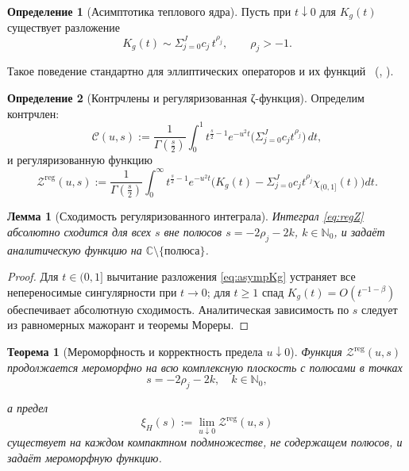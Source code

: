 \documentclass{article}
\numberwithin{equation}{section}
\theoremstyle{plain}
\newtheorem{theorem}{Теорема}
\newtheorem{lemma}{Лемма}
\theoremstyle{definition}
\newtheorem{definition}{Определение}
\theoremstyle{remark}
\def\rho{ρ}\def\sigma{σ}\def\Sigma{Σ}\def\tau{τ}%
\def\infty{∞}\def\partial{∂}\def\sum{Σ}\def\int{∫}%
\begin{document}
\begin{definition}[Асимптотика теплового ядра]
\label{def:asymp}
Пусть при \(t\downarrow 0\) для \(K_g(t)\) существует разложение
\begin{equation}
\label{eq:asympKg}
K_g(t)\sim \sum_{j=0}^{J} c_j\,t^{\rho_j}, \qquad \rho_j>-1.
\end{equation}
\end{definition}

\noindent
Такое поведение стандартно для эллиптических операторов и их функций 
~(\cite{Seeley1967}, \cite{Gilkey1995}).

\begin{definition}[Контрчлены и регуляризованная ζ-функция]
\label{def:counter}
Определим контрчлен:
\begin{equation}
\label{eq:counterterm}
\mathcal C(u,s)
:=\frac{1}{\Gamma(\tfrac s2)}\int_0^1 
t^{\frac s2-1} e^{-u^2 t}
\Big(\sum_{j=0}^{J} c_j t^{\rho_j}\Big)\,dt,
\end{equation}
и регуляризованную функцию
\begin{equation}
\label{eq:regZ}
\mathcal Z^{\mathrm{reg}}(u,s)
:=\frac{1}{\Gamma(\tfrac s2)}
\int_0^\infty t^{\frac s2-1} e^{-u^2 t}
\bigg(K_g(t)-\sum_{j=0}^{J} c_j t^{\rho_j}\chi_{(0,1]}(t)\bigg)dt.
\end{equation}
\end{definition}

\begin{lemma}[Сходимость регуляризованного интеграла]
\label{lemma:conv_reg}
Интеграл \eqref{eq:regZ} абсолютно сходится для всех \(s\) вне полюсов \(s=-2\rho_j-2k\), \(k\in\mathbb N_0\),
и задаёт аналитическую функцию на \(\mathbb C\setminus\{\text{полюса}\}\).
\end{lemma}

\begin{proof}
Для $t\in(0,1]$ вычитание разложения \eqref{eq:asympKg} устраняет все непереносимые сингулярности при $t\to0$;
для $t\ge1$ спад $K_g(t)=O(t^{-1-\beta})$ обеспечивает абсолютную сходимость.  
Аналитическая зависимость по $s$ следует из равномерных мажорант и теоремы Мореры.
\end{proof}

\begin{theorem}[Мероморфность и корректность предела $u\downarrow0$]
\label{thm:meromorphic_app}
Функция $\mathcal Z^{\mathrm{reg}}(u,s)$ продолжается мероморфно на всю комплексную плоскость с полюсами в точках
\begin{equation}
s = -2\rho_j - 2k, \quad k\in\mathbb N_0,
\label{eq:QSSC0046}
\end{equation}

а предел
\begin{equation}
\label{eq:xi_limit}
\xi_H(s):=\lim_{u\downarrow0}\mathcal Z^{\mathrm{reg}}(u,s)
\end{equation}
существует на каждом компактном подмножестве, не содержащем полюсов, и задаёт мероморфную функцию.
\end{theorem}
\end{document}
